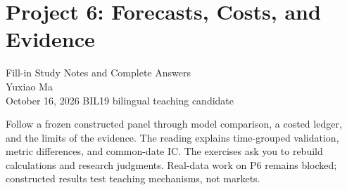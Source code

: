 \documentclass[letter]{loom}
\begin{document}
\color{inkiron}
\section*{Project 6: Forecasts, Costs, and Evidence}
\begin{center}
{\Large Fill-in Study Notes and Complete Answers}\\[0.7em]
{\large Yuxiao Ma}\\[0.3em]
October 16, 2026 \quad BIL19 bilingual teaching candidate
\end{center}
\begin{strand}
Follow a frozen constructed panel through model comparison, a costed ledger, and the limits of the evidence. The reading explains time-grouped validation, metric differences, and common-date IC. The exercises ask you to rebuild calculations and research judgments. Real-data work on P6 remains blocked; constructed results test teaching mechanisms, not markets.
\end{strand}

\end{document}
